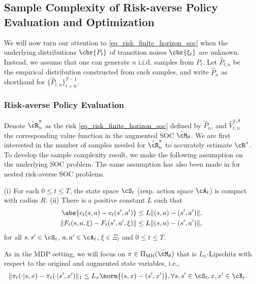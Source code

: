 \documentclass[9pt]{article}
\numberwithin{equation}{section}
\begin{document}
\subsection{Sample Complexity of Risk-averse Policy Evaluation and Optimization}
We will now turn our attention to \eqref{eq_risk_finite_horizon_soc} when the underlying distributions $\cbr{P_t}$ of transition noises $\cbr{\xi_t}$ are unknown. 
Instead, we assume that one can generate $n$ i.i.d. samples from $P_t$.
Let $\hat{P}_{t,n}$ be the empirical distribution constructed from such samples, 
and write $\hat{P}_n$ as  shorthand for $\{\hat{P}_{t,n}\}_{t=0}^{T-1}$.

\subsubsection{Risk-averse Policy Evaluation}

Denote  
$\hat{\cR}^\pi_n$ as the risk \eqref{eq_risk_finite_horizon_soc} defined by $\hat{P}_n$,
and $\hat{V}^{\pi, \theta}_{t,n}$ the corresponding value function in the augmented SOC $\tilde{\cM}_\theta$.
We are first interested in the number of samples needed for $\hat{\cR}^\pi_n$ to accurately estimate $\cR^\pi$.
To develop the sample complexity result, we make the following assumption on the underlying SOC problem. 
The same assumption has also been made in \cite{shapiro2025risk} for nested risk-averse SOC problems. 


\begin{assumption}
\label{ass-lip_soc-1}
(i) For each $0 \leq t \leq T$, the state space $\cS_t$ (resp. action space $\cA_t$) is compact with radius $R$.  (ii)
There is  a positive constant $L$  such that
\begin{eqnarray*}
&&\abs{ c_t(s, a ) - c_t(s', a') }    \leq L \| (s, a) - (s', a') \|,\\
&&  \left\| F_t(s, a,\xi) - F_t(s', a',\xi) \right\|    \leq L \| (s, a) - (s', a') \|,
\end{eqnarray*}
for all $s, s' \in \cS_t$, $a, a' \in    \cA_t$,  $\xi \in   \Xi_t$ and $0 \leq t \leq T$.
\end{assumption}

As in the MDP setting, we will focus on $\pi \in \Pi_{\mathrm{MR}}(\tilde{\cM}_\theta)$ that is $L_\pi$-Lipschitz with respect to the original and augmented state variables, i.e., 
\begin{align}\label{eq_finite_soc_policy_lip}
    \|\pi_t(\cdot|s,x) - \pi_t(\cdot|s',x')\|_1 \leq L_\pi \norm{(s,x) - (s', x')}, \forall s, s' \in \cS_t, x,x' \in \cX_t.
\end{align}
\end{document}
